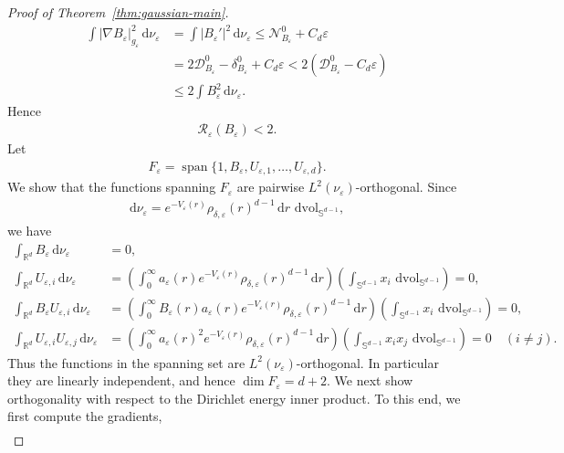 \documentclass[11pt,reqno]{amsart}
\numberwithin{equation}{section}
\theoremstyle{definition}
\theoremstyle{remark}
\def\cR {\mathcal{R}}
\newcommand{\spn}{\operatorname{span}}
\newcommand{\ud}{\mathrm{d}}
\newcommand{\0}{\emptyset}
\newcommand{\veps}{\varepsilon}
\newcommand{\bbR}{\mathbb R}
\newcommand{\bbS}{\mathbb S}
\newcommand{\calD}{\mathcal D}
\newcommand{\calN}{\mathcal N}
\newcommand{\dvol}{\,\mathrm{dvol}}
\begin{document}
\begin{proof}[Proof of Theorem~\ref{thm:gaussian-main}]
\begin{align}
        \int |\nabla B_\veps|_{g_\veps}^2\,\ud\nu_\veps
        &=
        \int |B_\veps'|^2\,\ud\nu_\veps
        \leq
        \calN_{B_\veps}^0+C_d\veps\\
        &=
        2\calD_{B_\veps}^0-\delta_{B_\veps}^0+C_d\veps
        <
        2(\calD_{B_\veps}^0-C_d\veps)\\
        &\leq
        2\int B_\veps^2\,\ud\nu_\veps.
\end{align}
Hence
\begin{align}\label{eq:radial-strict-new}
        \cR_\veps(B_\veps)<2.
\end{align}
Let
\begin{align}
        F_\veps
        =
        \spn\{1,B_\veps,U_{\veps,1},\dots,U_{\veps,d}\}.
\end{align}
We show that the functions spanning $F_\veps$ are pairwise \(L^2(\nu_\veps)\)-orthogonal. Since
\begin{align}
        \ud\nu_\veps
        =
        e^{-V_\veps(r)}\rho_{\delta,\veps}(r)^{d-1}\,\ud r\,\dvol_{\bbS^{d-1}},
\end{align}
we have
\begin{align}
        \int_{\bbR^d} B_\veps\,\ud\nu_\veps
        &=0,\\
        \int_{\bbR^d} U_{\veps,i}\,\ud\nu_\veps
        &=
        \left(\int_0^\infty
        a_\veps(r)e^{-V_\veps(r)}\rho_{\delta,\veps}(r)^{d-1}\,\ud r
        \right)
        \left(\int_{\bbS^{d-1}}x_i\,\dvol_{\bbS^{d-1}}\right)
        =
        0,\\
        \int_{\bbR^d} B_\veps U_{\veps,i}\,\ud\nu_\veps
        &=
        \left(\int_0^\infty
        B_\veps(r)a_\veps(r)e^{-V_\veps(r)}
        \rho_{\delta,\veps}(r)^{d-1}\,\ud r
        \right)
        \left(\int_{\bbS^{d-1}}x_i\,\dvol_{\bbS^{d-1}}\right)
        =
        0,\\
        \int_{\bbR^d} U_{\veps,i}U_{\veps,j}\,\ud\nu_\veps
        &=
        \left(\int_0^\infty
        a_\veps(r)^2e^{-V_\veps(r)}
        \rho_{\delta,\veps}(r)^{d-1}\,\ud r
        \right)
        \left(\int_{\bbS^{d-1}}x_ix_j\,\dvol_{\bbS^{d-1}}\right)
        =
        0
        \quad(i\neq j).
\end{align}
Thus the functions in the spanning set are \(L^2(\nu_\veps)\)-orthogonal. In
particular they are linearly independent, and hence \(\dim F_\veps=d+2\). We next show orthogonality with respect to the Dirichlet energy inner product. To this end, we first compute
the gradients,
\begin{align}

\end{align}
\end{proof}
\end{document}
